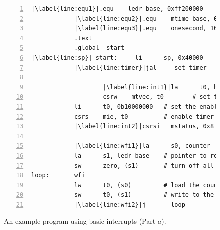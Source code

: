 \documentclass[11pt, twoside, pdftex]{article}
\begin{document}
\begin{figure}[h]
\begin{center}
\begin{minipage}[h]{15 cm}
\begin{lstlisting}[style=defaultNiosVStyle, name=ints, numbers=left, escapechar=|]
            |\label{line:equ1}|.equ    ledr_base, 0xff200000
            |\label{line:equ2}|.equ    mtime_base, 0xff202100
            |\label{line:equ3}|.equ    onesecond, 100000000
            .text
            .global _start
|\label{line:sp}|_start:     li      sp, 0x40000      # initialize the stack location
            |\label{line:timer}|jal     set_timer        # initialize the timer
     
                    |\label{line:int1}|la      t0, handler
                    csrw    mtvec, t0        # set trap address
            li      t0, 0b10000000   # set the enable pattern
            csrs    mie, t0          # enable timer interrupts
            |\label{line:int2}|csrsi   mstatus, 0x8     # enable global interrupts

            |\label{line:wfi1}|la      s0, counter      # pointer to counter
            la      s1, ledr_base    # pointer to red lights
            sw      zero, (s1)       # turn off all lights
loop:       wfi
            lw      t0, (s0)         # load the counter value
            sw      t0, (s1)         # write to the lights
            |\label{line:wfi2}|j       loop
\end{lstlisting}
	\caption{An example program using basic interrupts (Part $a$).}
	\label{fig:ints}
\end{minipage}
\end{center}
\end{figure}
\end{document}
